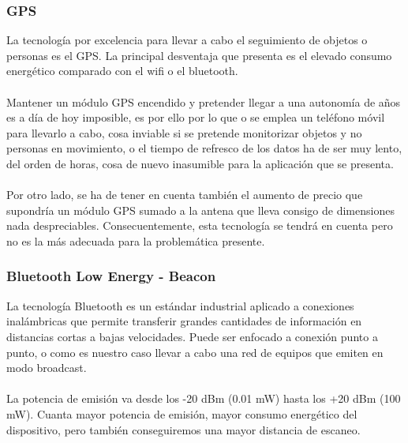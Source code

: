 \documentclass[paper=a4, fontsize=11pt,twoside]{scrartcl}	%
\begin{document}
        \subsubsection {GPS}
            La tecnología por excelencia para llevar a cabo el seguimiento de objetos o personas es el GPS. La principal desventaja
            que presenta es el elevado consumo energético comparado con el wifi o el bluetooth.
            \paragraph{}
            Mantener un módulo GPS encendido y pretender llegar a una autonomía de años es a día de hoy
            imposible, es por ello por lo que o se emplea un teléfono móvil para llevarlo a cabo, cosa inviable si se pretende 
            monitorizar objetos  y no personas en movimiento, o el tiempo de refresco de los datos ha de ser muy lento, del orden de horas,
            cosa de nuevo inasumible para la aplicación que se presenta.
            \paragraph{}
            Por otro lado, se ha de tener en cuenta también el aumento de precio que supondría un módulo GPS sumado a la antena que lleva consigo de 
            dimensiones nada despreciables. 
            Consecuentemente, esta tecnología se tendrá en cuenta pero no es la más adecuada para la problemática presente.
        \subsubsection {Bluetooth Low Energy - Beacon}
            La tecnología Bluetooth es un estándar industrial aplicado a conexiones inalámbricas que permite transferir 
            grandes cantidades de información en distancias cortas a bajas velocidades. Puede ser enfocado a conexión
            punto a punto, o como es nuestro caso llevar a cabo una red de equipos que emiten en modo broadcast.
            \paragraph{}
            La potencia de emisión va desde los -20 dBm (0.01 mW) hasta los +20 dBm (100 mW). Cuanta mayor potencia de emisión, mayor consumo energético
            del dispositivo, pero también conseguiremos una mayor distancia de escaneo.
\end{document}
